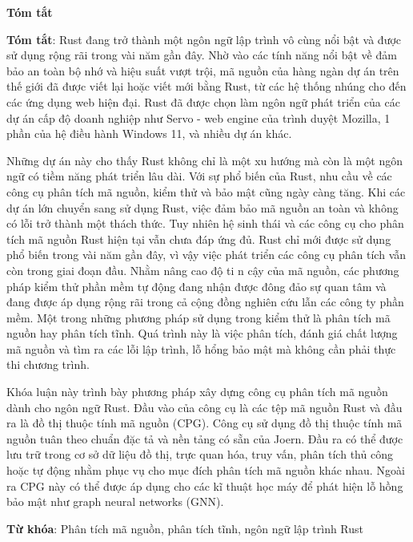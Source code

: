 \begin{center}
\textbf{\large{Tóm tắt}	}
\end{center}


\begin{small}
\textbf{Tóm tắt}:
Rust đang trở thành một ngôn ngữ lập trình vô cùng nổi bật và được sử dụng rộng rãi trong vài năm gần đây. Nhờ vào các tính năng nổi bật về đảm bảo an toàn bộ nhớ và hiệu suất vượt trội, mã nguồn của hàng ngàn dự án trên thế giới đã được viết lại hoặc viết mới bằng Rust, từ các hệ thống nhúng cho đến các ứng dụng web hiện đại. Rust đã được chọn làm ngôn ngữ phát triển của các dự án cấp độ doanh nghiệp như Servo - web engine của trình duyệt Mozilla, 1 phần của hệ điều hành Windows 11, và nhiều dự án khác.

Những dự án này cho thấy Rust không chỉ là một xu hướng mà còn là một ngôn ngữ có tiềm năng phát triển lâu dài. Với sự phổ biến của Rust, nhu cầu về các công cụ phân tích mã nguồn, kiểm thử và bảo mật cũng ngày càng tăng. Khi các dự án lớn chuyển sang sử dụng Rust, việc đảm bảo mã nguồn an toàn và không có lỗi trở thành một thách thức. Tuy nhiên hệ sinh thái và các công cụ cho phân tích mã nguồn Rust hiện tại vẫn chưa đáp ứng đủ. Rust chỉ mới được sử dụng phổ biến trong vài năm gần đây, vì vậy việc phát triển các công cụ phân tích vẫn còn trong giai đoạn đầu. Nhằm nâng cao độ ti n cậy của mã nguồn, các phương pháp kiểm thử phần mềm tự động đang nhận được đông đảo sự quan tâm và đang được áp dụng rộng rãi trong cả cộng đồng nghiên cứu lẫn các công ty phần mềm. Một trong những phương pháp sử dụng trong kiểm thử là phân tích mã nguồn hay phân tích tĩnh. Quá trình này là việc phân tích, đánh giá chất lượng mã nguồn và tìm ra các lỗi lập trình, lỗ hổng bảo mật mà không cần phải thực thi chương trình.

Khóa luận này trình bày phương pháp xây dựng công cụ phân tích mã nguồn dành cho ngôn ngữ Rust. Đầu vào của công cụ là các tệp mã nguồn Rust và đầu ra là đồ thị thuộc tính mã nguồn (CPG). Công cụ sử dụng đồ thị thuộc tính mã nguồn tuân theo chuẩn đặc tả và nền tảng có sẵn của Joern. Đầu ra có thể được lưu trữ trong cơ sở dữ liệu đồ thị, trực quan hóa, truy vấn, phân tích thủ công hoặc tự động nhằm phục vụ cho mục đích phân tích mã nguồn khác nhau. Ngoài ra CPG này có thể được áp dụng cho các kĩ thuật học máy để phát hiện lỗ hồng bảo mật như graph neural networks (GNN).

\vspace*{1cm}
\textbf{Từ khóa}: Phân tích mã nguồn, phân tích tĩnh, ngôn ngữ lập trình Rust

\end{small}
